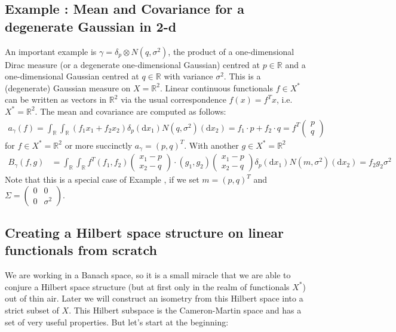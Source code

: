 \documentclass{scrartcl}
\theoremstyle{definition}
\theoremstyle{remark}
\newcommand{\de}{\mathrm d}
\newcommand{\R}{\mathbb R}
\newcommand*\circled[1]{\tikz[baseline=(char.base)]{
            \node[shape=circle,draw,inner sep=2pt] (char) {#1};}}
\DeclareRobustCommand{\myboxtwo}[2][blue!20]{%
\begin{tcolorbox}[   %
        breakable,
        left=0pt,
        right=0pt,
        top=0pt,
        bottom=0pt,
        colback=#1,
        colframe=#1,
        width=\dimexpr\textwidth\relax, 
        enlarge left by=0mm,
        boxsep=5pt,
        arc=10pt,outer arc=10pt,
        ]
        #2
\end{tcolorbox}
}
\begin{document}
\myboxtwo{
\subsection*{Example \circled{3}: Mean and Covariance for a degenerate Gaussian in 2-d}
An important example is $\gamma = \delta_p \otimes N(q, \sigma^2)$, the product of a one-dimensional Dirac measure (or a degenerate one-dimensional Gaussian) centred at $p\in\R$ and a one-dimensional Gaussian centred at $q\in\R$ with variance $\sigma^2$. This is a (degenerate) Gaussian measure on $X=\R^2$. Linear continuous functionals $f\in X^*$ can be written as vectors in $\R^2$ via the usual correspondence $f(x) = f^Tx$, i.e. $X^* = \R^2$. The mean and covariance are computed as follows:
\begin{align*}
a_\gamma(f) = \int_\R\int_\R (f_1x_1+f_2x_2) \delta_p(\de x_1) N(q, \sigma^2)(\de x_2) = f_1\cdot p + f_2\cdot q = f^T \begin{pmatrix}
p\\q
\end{pmatrix}
\end{align*}
for $f\in X^*=\R^2$ or more succinctly $a_\gamma = (p,q)^T$. With another $g\in X^*=\R^2$
\begin{align*}
B_\gamma(f,g) &= \int_\R\int_\R f^T (f_1,f_2)\begin{pmatrix}
x_1-p\\x_2-q
\end{pmatrix}\cdot (g_1,g_2)\begin{pmatrix}
x_1-p\\x_2-q
\end{pmatrix} \delta_p(\de x_1) N(m,\sigma^2)(\de x_2) = f_2g_2\sigma^2
\end{align*}
Note that this is a special case of Example \circled{1}, if we set $m = (p,q)^T$ and $\Sigma = \begin{pmatrix}
0&0\\0&\sigma^2
\end{pmatrix}$.
}
\subsection{Creating a Hilbert space structure on linear functionals from scratch}
We are working in a Banach space, so it is a small miracle that we are able to conjure a Hilbert space structure (but at first only in the realm of functionals $X^*$) out of thin air. Later we will construct an isometry from this Hilbert space into a strict subset of $X$. This Hilbert subspace is the Cameron-Martin space and has a set of very useful properties. But let's start at the beginning:
\end{document}
